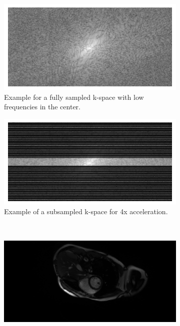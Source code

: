 \begin{figure}[h]%
	\centering
	\graphicspath{{images/}{\main/images/}}
	\begin{subfigure}{0.45\textwidth}
    		\includegraphics[width=\textwidth]{k-space_fullysampled.png}
    		\caption{Example for a fully sampled k-space with low frequencies in the center.}
    		\label{fig:fullySampled}
	\end{subfigure}
	\hfill
	\begin{subfigure}{0.45\textwidth}
    		\includegraphics[width=\textwidth]{k-space_subsampled.png}
    		\caption{Example of a subsampled k-space for 4x acceleration.}
    		\label{fig:subSampled}
	\end{subfigure}\\
	\begin{subfigure}{0.45\textwidth}
    		\includegraphics[width=\textwidth]{image_fullysampled.png}

\end{subfigure}
\end{figure}
